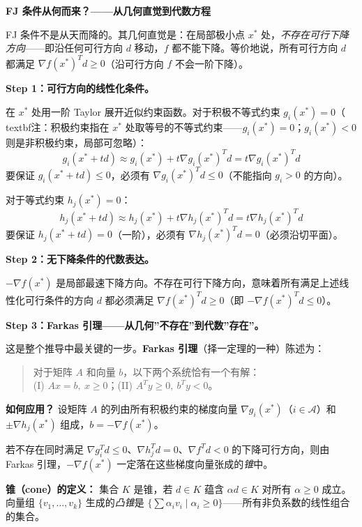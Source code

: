 \medskip

\textbf{FJ 条件从何而来？——从几何直觉到代数方程}

FJ 条件不是从天而降的。其几何直觉是：在局部极小点 $x^*$ 处，\emph{不存在可行下降方向}——即沿任何可行方向 $d$ 移动，$f$ 都不能下降。等价地说，所有可行方向 $d$ 都满足 $\nabla f(x^*)^T d \ge 0$（沿可行方向 $f$ 不会一阶下降）。

\smallskip
\textbf{Step 1：可行方向的线性化条件。}

在 $x^*$ 处用一阶 Taylor 展开近似约束函数。对于积极不等式约束 $g_i(x^*)=0$（\\textbf{注：}积极约束指在 $x^*$ 处取等号的不等式约束——$g_i(x^*)=0$；$g_i(x^*)<0$ 则是非积极约束，局部可忽略）：
\[
g_i(x^*+td) \approx g_i(x^*) + t\nabla g_i(x^*)^T d = t\nabla g_i(x^*)^T d
\]
要保证 $g_i(x^*+td)\le0$，必须有 $\nabla g_i(x^*)^T d \le 0$（不能指向 $g_i>0$ 的方向）。

对于等式约束 $h_j(x^*)=0$：
\[
h_j(x^*+td) \approx h_j(x^*) + t\nabla h_j(x^*)^T d = t\nabla h_j(x^*)^T d
\]
要保证 $h_j(x^*+td)=0$（一阶），必须有 $\nabla h_j(x^*)^T d = 0$（必须沿切平面）。

\smallskip
\textbf{Step 2：无下降条件的代数表达。}

$-\nabla f(x^*)$ 是局部最速下降方向。不存在可行下降方向，意味着所有满足上述线性化可行条件的方向 $d$ 都必须满足 $\nabla f(x^*)^T d \ge 0$（即 $-\nabla f(x^*)^T d \le 0$）。

\smallskip
\textbf{Step 3：Farkas 引理——从几何”不存在”到代数”存在”。}

这是整个推导中最关键的一步。\textbf{Farkas 引理}（择一定理的一种）陈述为：

\begin{quote}
对于矩阵 $A$ 和向量 $b$，以下两个系统恰有一个有解：\\
(I) $Ax=b,\ x\ge 0$；\quad (II) $A^T y \ge 0,\ b^T y < 0$。
\end{quote}

\textbf{如何应用？} 设矩阵 $A$ 的列由所有积极约束的梯度向量 $\nabla g_i(x^*)$（$i\in\mathcal{A}$）和 $\pm\nabla h_j(x^*)$ 组成，$b=-\nabla f(x^*)$。

若不存在同时满足 $\nabla g_i^T d\le0$、$\nabla h_j^T d=0$、$\nabla f^T d<0$ 的下降可行方向，则由 Farkas 引理，$-\nabla f(x^*)$ 一定落在这些梯度向量张成的\emph{锥}中。

\smallskip
\textbf{锥（cone）的定义：} 集合 $K$ 是锥，若 $d\in K$ 蕴含 $\alpha d\in K$ 对所有 $\alpha\ge0$ 成立。向量组 $\{v_1,\dots,v_k\}$ 生成的\emph{凸锥}是 $\{\sum \alpha_i v_i \mid \alpha_i\ge 0\}$——所有非负系数的线性组合的集合。

